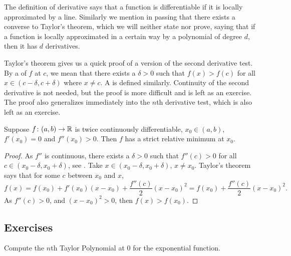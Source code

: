 The definition of derivative says that
a function is
differentiable if it
is locally approximated by a line.
Similarly we mention in passing that there exists a converse to Taylor's
theorem,
which we will neither state nor prove,
saying that if a function is
locally approximated in a certain way by a polynomial of degree $d$, then it
has $d$ derivatives.

\medskip

Taylor's theorem gives us a quick proof of a version of
the second derivative test.
By a \emph{} of $f$ at $c$,
we mean that there exists a $\delta > 0$ such that $f(x) > f(c)$ for
all $x \in (c-\delta,c+\delta)$ where $x\not=c$.
A \emph{} is defined similarly.
Continuity of the second derivative is not needed, but the proof is more
difficult and is left as an exercise.  The proof also generalizes
immediately into the $n$th derivative test, which is also left as
an exercise.

\begin{prop}
Suppose $f \colon (a,b) \to {\mathbb{R}}$ is twice continuously differentiable,
$x_0 \in (a,b)$, $f'(x_0) = 0$ and $f''(x_0) > 0$.  Then $f$ has a strict relative
minimum at $x_0$.
\end{prop}

\begin{proof}
As $f''$ is continuous, there exists a $\delta > 0$
such that $f''(c) > 0$ for all $c \in (x_0-\delta,x_0+\delta)$,
see .
Take $x \in (x_0-\delta,x_0+\delta)$, $x \not= x_0$.
Taylor's theorem says that for some $c$ between $x_0$ and $x$,
\begin{equation*}
f(x) 
=
f(x_0) + f'(x_0) (x-x_0) +
\frac{f''(c)}{2}{(x-x_0)}^{2} 
=
f(x_0) + \frac{f''(c)}{2}{(x-x_0)}^{2}  .
\end{equation*}
As $f''(c) > 0$, and ${(x-x_0)}^2 > 0$, then $f(x) > f(x_0)$.
\end{proof}

\subsection{Exercises}

\begin{exercise}
Compute the $n$th Taylor Polynomial at $0$ for the exponential function.
\end{exercise}


